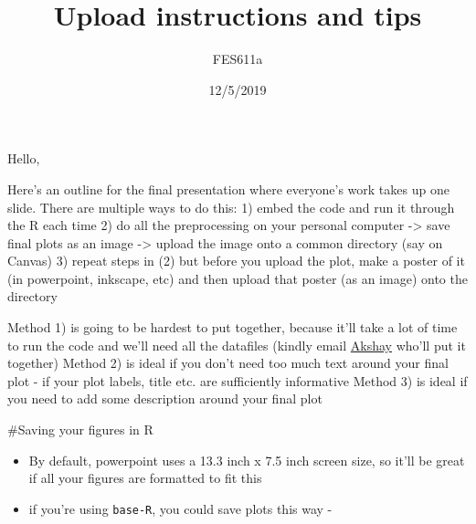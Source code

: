 \documentclass[]{article}
\title{Upload instructions and tips}
\author{FES611a}
\date{12/5/2019}
\newenvironment{Shaded}{\begin{snugshade}}{\end{snugshade}}
\newcommand{\CommentTok}[1]{\textcolor[rgb]{0.56,0.35,0.01}{\textit{#1}}}
\newcommand{\DataTypeTok}[1]{\textcolor[rgb]{0.13,0.29,0.53}{#1}}
\newcommand{\DecValTok}[1]{\textcolor[rgb]{0.00,0.00,0.81}{#1}}
\newcommand{\KeywordTok}[1]{\textcolor[rgb]{0.13,0.29,0.53}{\textbf{#1}}}
\newcommand{\NormalTok}[1]{#1}
\newcommand{\OperatorTok}[1]{\textcolor[rgb]{0.81,0.36,0.00}{\textbf{#1}}}
\newcommand{\StringTok}[1]{\textcolor[rgb]{0.31,0.60,0.02}{#1}}
\providecommand{\tightlist}{%
  \setlength{\itemsep}{0pt}\setlength{\parskip}{0pt}}
\begin{document}
\maketitle

Hello,

Here's an outline for the final presentation where everyone's work takes
up one slide. There are multiple ways to do this: 1) embed the code and
run it through the R each time 2) do all the preprocessing on your
personal computer -\textgreater{} save final plots as an image
-\textgreater{} upload the image onto a common directory (say on Canvas)
3) repeat steps in (2) but before you upload the plot, make a poster of
it (in powerpoint, inkscape, etc) and then upload that poster (as an
image) onto the directory

Method 1) is going to be hardest to put together, because it'll take a
lot of time to run the code and we'll need all the datafiles (kindly
email \href{akshay.surendra@yale.edu}{Akshay} who'll put it together)
Method 2) is ideal if you don't need too much text around your final
plot - if your plot labels, title etc. are sufficiently informative
Method 3) is ideal if you need to add some description around your final
plot

\#Saving your figures in R

\begin{itemize}
\tightlist
\item
  By default, powerpoint uses a 13.3 inch x 7.5 inch screen size, so
  it'll be great if all your figures are formatted to fit this
\item
  if you're using \texttt{base-R}, you could save plots this way -
\end{itemize}

\begin{Shaded}
\end{Shaded}
\end{document}
